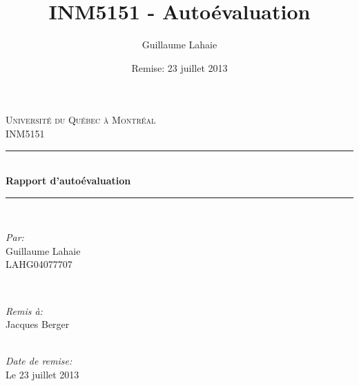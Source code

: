 \documentclass[11pt]{article} %
\title{INM5151 - Autoévaluation}
\author{Guillaume Lahaie}
\date{Remise: 23 juillet 2013}
\newcommand\blankpage{%
  \null
  \thispagestyle{empty}%
  \addtocounter{page}{-1}%
  \newpage}
\begin{document}


\begin{titlepage}

\newcommand{\HRule}{\rule{\linewidth}{0.5mm}} %

\center %

\textsc{\LARGE Université du Québec à Montréal}\\[1.5cm] %
\textsc{\Large INM5151}\\[0.5cm] %

\HRule \\[1.5cm]
{ \huge \bfseries Rapport d'autoévaluation}\\[0.4cm] %
\HRule \\[1.5cm]

\begin{minipage}{0.4\textwidth}
\begin{flushleft} \large
\emph{Par:}\\
Guillaume Lahaie \\ LAHG04077707 %
\end{flushleft}
\end{minipage}
~
\begin{minipage}{0.4\textwidth}
\begin{flushright} \large
\emph{Remis à:} \\
Jacques Berger %
\end{flushright}
\end{minipage}\\[4cm]

{\large \emph{Date de remise:} \\ Le 23 juillet 2013}\\[3cm] %


\vfill %

\end{titlepage}
\blankpage
\end{document}
